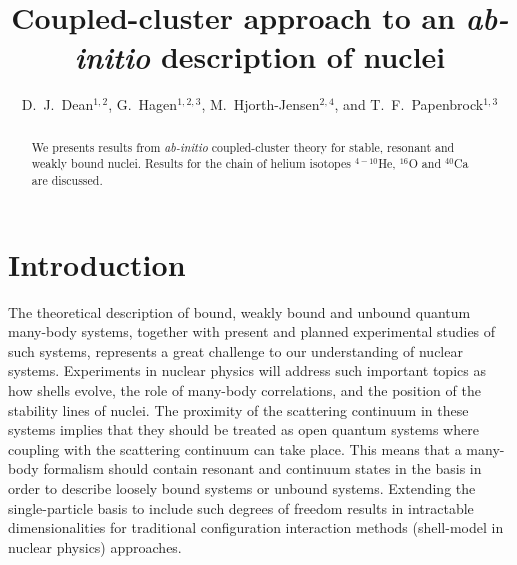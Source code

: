 \documentclass{ws-procs975x65}
\begin{document}
\title{Coupled-cluster approach to an {\it ab-initio} description of nuclei}

\author{D.~J.~Dean$^{1,2}$, G.~Hagen$^{1,2,3}$, M.~Hjorth-Jensen$^{2,4}$, and T.~F.~Papenbrock$^{1,3}$}

\address{$^1$Physics Division, Oak Ridge National Laboratory, \\ P.O. Box 2008,
Oak Ridge, TN 37831, U.S.A.} 

\address{$^2$Center of Mathematics for Applications,
University of Oslo, N-0316 Oslo, Norway }

\address{$^3$Department of Physics and Astronomy, University of Tennessee,  \\
  Knoxville, Tennessee 37996, U.S.A. } 


\address{$^4$Department of Physics, University of Oslo, N-0316 Oslo, Norway}



\begin{abstract}
We presents results from {\it ab-initio} coupled-cluster theory for stable, 
resonant and weakly bound nuclei. Results for the chain of helium isotopes $^{4-10}$He,
$^{16}$O and $^{40}$Ca are discussed.  
\end{abstract}


\bodymatter

\section{Introduction}

The theoretical description of bound, weakly bound and unbound
quantum many-body systems, together with present and planned experimental studies
of such systems, represents a  great challenge to our understanding of nuclear systems.
Experiments in nuclear physics will address such important topics
as how shells evolve, the role of many-body correlations, and the position of
the stability lines of nuclei.
The proximity of the scattering continuum
in these systems implies that they should be treated as
open quantum systems where coupling with the scattering
continuum can take place. This means that a many-body formalism
should contain resonant and continuum states in the basis in order to describe
loosely bound systems or unbound systems.
Extending the single-particle basis to include such degrees of freedom results in intractable
dimensionalities for traditional configuration interaction methods (shell-model  in nuclear physics)  approaches.
\end{document}
